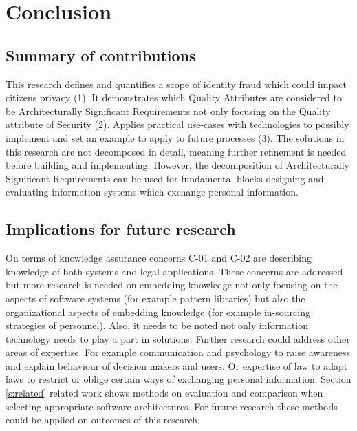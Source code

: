 \chapter{Conclusion}\label{s:conclusion}
\section{Summary of contributions}
This research defines and quantifies a scope of identity fraud which could impact citizens privacy (1). It demonstrates which Quality Attributes are considered to be Architecturally Significant Requirements not only focusing on the Quality attribute of Security (2). Applies practical use-cases with technologies to possibly implement and set an example to apply to future processes (3). The solutions in this research are not decomposed in detail, meaning further refinement is needed before building and implementing. However, the decomposition of Architecturally Significant Requirements can be used for fundamental blocks designing and evaluating information systems which exchange personal information. 

\section{Implications for future research}\label{Implications}
On terms of knowledge assurance concerns C-01 and C-02 are describing knowledge of both systems and legal applications. These concerns are addressed but more research is needed on embedding knowledge not only focusing on the aspects of software systems (for example pattern libraries) but also the organizational aspects of embedding knowledge (for example in-sourcing strategies of personnel). 
Also, it needs to be noted not only information technology needs to play a part in solutions. Further research could address other areas of expertise. For example communication and psychology to raise awareness and explain behaviour of decision makers and users. Or expertise of law to adapt laws to restrict or oblige certain ways of exchanging personal information. Section \ref{s:related} related work shows methods on evaluation and comparison when selecting appropriate software architectures. For future research these methods could be applied on outcomes of this research.


